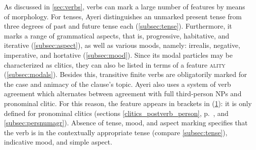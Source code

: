 \begin{figure}
\begin{morphlex}
\ex\label{ex:inflmorphlex}%
\xe
\end{morphlex}
\end{figure}

As discussed in \autoref{sec:verbs}, verbs can mark a large number of features
by means of morphology. For tenses, Ayeri distinguishes an unmarked present
tense from three degrees of past and future tense each
(\autoref{subsec:tense}). Furthermore, it marks a range of grammatical aspects,
that is, progressive, habitative, and iterative (\autoref{subsec:aspect}), as
well as various moods, namely: irrealis, negative, imperative, and hortative
(\autoref{subsec:mood}). Since its modal particles may be characterized as
clitics, they can also be listed in terms of a feature \Mod\textsc{ality}
(\autoref{subsec:modals}). Besides this, transitive finite verbs are
obligatorily marked for the case and animacy of the clause's topic. Ayeri also
uses a system of verb agreement which alternates between agreement with full
third-person NPs and pronominal clitic. For this reason, the feature 
\ups{\Subj{} \Pred} appears in brackets in (\ref{ex:inflmorphlex}): it is only
defined for pronominal clitics (sections \ref{clitics_postverb_person},
p.~\pageref{clitics_postverb_person}, and \ref{subsec:persnumagr}). Absence of
tense, mood, and aspect marking specifies that the verb is in the contextually
appropriate tense (compare \autoref{subsec:tense}), indicative mood, and simple
aspect.

